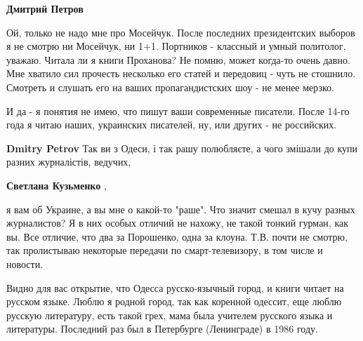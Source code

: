 \begin{itemize}
\begin{itemize}
 
\textbf{Дмитрий Петров} 

Ой, только не надо мне про Мосейчук. После последних президентских выборов я не
смотрю ни Мосейчук, ни 1+1. Портников - классный и умный политолог, уважаю.
Читала ли я книги Проханова? Не помню, может когда-то очень давно. Мне хватило
сил прочесть несколько его статей и передовиц - чуть не стошнило. Смотреть и
слушать его на ваших пропагандистских шоу - не менее мерзко.

И да - я понятия не имею, что пишут ваши современные писатели. После 14-го года
я читаю наших, украинских писателей, ну, или других - не российских.

 
\textbf{Dmitry Petrov} Так ви з Одеси, і так рашу полюбляєте, а чого змішали до купи разних журналістів, ведучих,

 
\textbf{Светлана Кузьменко} , 

я вам об Украине, а вы мне о какой-то "раше". Что значит смешал в кучу разных
журналистов? Я в них особых отличий не нахожу, не такой тонкий гурман, как вы.
Все отличие, что два за Порошенко, одна за клоуна. Т.В. почти не смотрю, так
пролистываю некоторые передачи по смарт-телевизору, в том числе и новости.

Видно для вас открытие, что Одесса русско-язычный город, и книги читает на
русском языке. Люблю я родной город, так как коренной одессит, еще люблю
русскую литературу, есть такой грех, мама была учителем русского языка и
литературы. Последний раз был в Петербурге (Ленинграде) в 1986 году.


 

\end{itemize}
\end{itemize}

